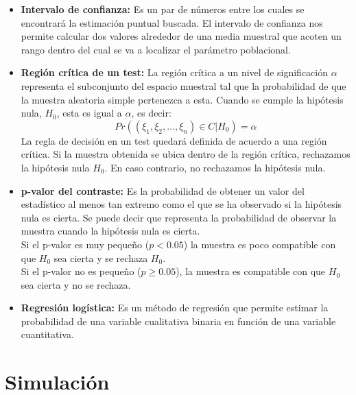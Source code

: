 \documentclass[12pt,a4paper]{article}
\begin{document}
\begin{itemize}
    \item \textbf{Intervalo de confianza:} Es un par de números entre los cuales se encontrará la estimación puntual buscada. El intervalo de confianza nos permite calcular dos valores alrededor de una media muestral que acoten un rango dentro del cual se va a localizar el parámetro poblacional.
    
    \item \textbf{Región crítica de un test:} La región crítica a un nivel de significación $\alpha$ representa el subconjunto del espacio muestral tal que la probabilidad de que la muestra aleatoria simple pertenezca a esta. Cuando se cumple la hipótesis nula, $H_0$, esta es igual a $\alpha$, es decir:
    \begin{equation}
        Pr((\xi_1, \xi_2, ..., \xi_n)\in C|H_0) = \alpha
    \end{equation}
    La regla de decisión en un test quedará definida de acuerdo a una región crítica. Si la muestra obtenida se ubica dentro de la región crítica, rechazamos la hipótesis nula $H_0$. En caso contrario, no rechazamos la hipótesis nula.
    
    \item \textbf{p-valor del contraste:} Es la probabilidad de obtener un valor del estadístico al menos tan extremo como el que se ha observado si la hipótesis nula es cierta. Se puede decir que representa la probabilidad de observar la muestra cuando la hipótesis nula es cierta.\\
    Si el p-valor es muy pequeño ($p < 0.05$) la muestra es poco compatible con que $H_0$ sea cierta y se rechaza $H_0$.\\
    Si el p-valor no es pequeño ($p \geq 0.05$), la muestra es compatible con que $H_0$ sea cierta y no se rechaza.
    
    \item \textbf{Regresión logística:} Es un método de regresión que permite estimar la probabilidad de una variable cualitativa binaria en función de una variable cuantitativa.
    
    
\end{itemize}

\section{Simulación}
\end{document}
